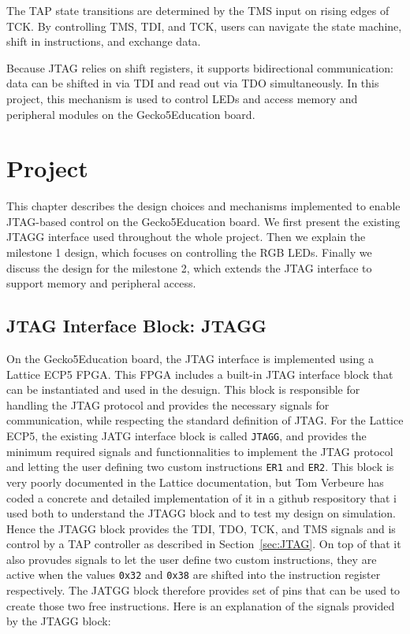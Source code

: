 \documentclass[a4paper,11pt,oneside]{report}
\newcommand{\boardName}{Gecko5Education \xspace}
\begin{document}
The TAP state transitions are determined by the TMS input on rising edges of TCK.  
By controlling TMS, TDI, and TCK, users can navigate the state machine,  
shift in instructions, and exchange data.  

Because JTAG relies on shift registers, it supports bidirectional communication:  
data can be shifted in via TDI and read out via TDO simultaneously.  
In this project, this mechanism is used to control LEDs  
and access memory and peripheral modules on the \boardName board.  


\chapter{Project}
This chapter describes the design choices and mechanisms implemented to enable 
JTAG-based control on the \boardName board.  
We first present the existing JTAGG interface used throughout the whole project.
Then we explain the milestone 1 design, which focuses on controlling the RGB LEDs.  
Finally we discuss the design for the milestone 2, which extends the JTAG interface to support memory and peripheral access.  

\section{JTAG Interface Block: JTAGG}

On the \boardName board, the JTAG interface is implemented using a Lattice ECP5 FPGA. This FPGA includes a built-in JTAG interface block that 
can be instantiated and used in the desuign. This block is responsible for handling the JTAG protocol and provides the necessary signals for communication,
while respecting the standard definition of JTAG. 
For the Lattice ECP5, the existing JATG interface block is called \texttt{JTAGG}, and provides the minimum required signals and 
functionnalities to implement the JTAG protocol and letting the user defining two custom instructions \texttt{ER1} and \texttt{ER2}. 
This block is very poorly documented in the Lattice documentation, but Tom Verbeure has coded a concrete and detailed implementation of it in a github respository that i used both to understand the JTAGG block and to test my design on simulation.
Hence the JTAGG block provides the TDI, TDO, TCK, and TMS signals and is control by a TAP controller as described in Section~\ref{sec:JTAG}.
On top of that it also provudes signals to let the user define two custom instructions, they are active when the values \texttt{0x32} and \texttt{0x38} are shifted into the instruction register respectively.
The JATGG block therefore provides set of pins that can be used to create those two free instructions.
Here is an explanation of the signals provided by the JTAGG block:
\end{document}
